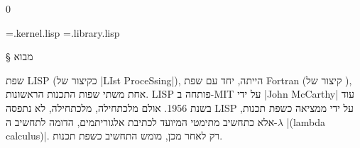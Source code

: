 \def\CPL{\E|C|\xspace}

\setcounter{library}0

\newread \tempFile %
\newwrite {} %
\newwrite \libraryFile %
\immediate \openout {}=\jobname.kernel.lisp
\immediate \openout \libraryFile=\jobname.library.lisp

\newenvironment{KERNEL}{%
  \stepcounter{kernel}
  \def\fileName{\jobname.kernel.\arabic{kernel}.lisp}%
  \global\let\savedifeof=\ifeof
  \def\ifeof##1{\global\let\ifeof=\savedifeof\iftrue}%
  \csname filecontents*\endcsname{\fileName}%
}{%
  \csname endfilecontents*\endcsname%
  \pagebreak[3]%
  \LTR
  \endLTR
  \pagebreak[3]%
  \openin\tempFile=\fileName
  \begingroup\endlinechar=-1
  \loop\unless\ifeof \tempFile
  \read\tempFile to\fileline %
  \immediate\write\kernelFile {\unexpanded\expandafter{\fileline}}
  \repeat
  \immediate\write \kernelFile {¢}
  \immediate\write \kernelFile {\unexpanded\expandafter{\pagebreak}[3]}
  \immediate\write \kernelFile {¢}
  \endgroup
  \closein \tempFile
}

\newenvironment{LIBRARY}{%
  \stepcounter{library}
  \def\fileName{\jobname.library.\arabic{library}.lisp}%
  \global\let\savedifeof=\ifeof
  \def\ifeof##1{\global\let\ifeof=\savedifeof\iftrue}%
  \csname filecontents*\endcsname{\fileName}%
}{%
  \csname endfilecontents*\endcsname%
  \pagebreak[3]%
  \LTR
  \endLTR
  \pagebreak[3]%
  \newread \tempFile %
  \openin \tempFile=\fileName
  \begingroup\endlinechar=-1
  \loop\unless\ifeof \tempFile
  \read\tempFile to\fileline %
  \immediate\write \libraryFile
  {\unexpanded\expandafter{\fileline}} %
  \repeat
  \endgroup
  \closein \tempFile
}%

§ מבוא

שפת LISP (כקיצור של \E|LIst ProceSsing|), הייתה, יחד עם שפת Fortran (קיצור של
), אחת משתי שפות התכנות הראשונות. LISP פותחה ב-MIT על
ידי \E|John McCarthy| עוד בשנת 1956. אולם מלכתחילה, מלכתחילה, לא נתפסה LISP
על ידי ממציאה כשפת תכנות, אלא כתחשיב מתימטי המיועד לכתיבת אלגוריתמים,
הדומה לתחשיב ה-$λ$ \E|(lambda calculus)|. רק לאחר מכן, מומש התחשיב כשפת תכנות.

